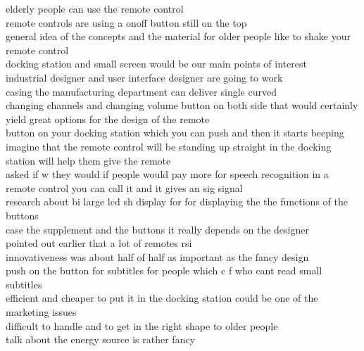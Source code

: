 \documentclass[11pt,a4paper]{article}
\begin{document}
\begin{mdframed}[style=theoremstyle, frametitle={Our System (FluCovRank) (250 words)}]
elderly people can use the remote control
\\ remote controls are using a onoff button still on the top
\\ general idea of the concepts and the material for older people like to shake your remote control
\\ docking station and small screen would be our main points of interest
\\ industrial designer and user interface designer are going to work
\\ casing the manufacturing department can deliver single curved
\\ changing channels and changing volume button on both side that would certainly yield great options for the design of the remote
\\ button on your docking station which you can push and then it starts beeping
\\ imagine that the remote control will be standing up straight in the docking station will help them give the remote
\\ asked if w they would if people would pay more for speech recognition in a remote control you can call it and it gives an sig signal
\\ research about bi large lcd sh display for for displaying the the functions of the buttons
\\ case the supplement and the buttons it really depends on the designer
\\ pointed out earlier that a lot of remotes rsi
\\ innovativeness was about half of half as important as the fancy design
\\ push on the button for subtitles for people which c f who cant read small subtitles
\\ efficient and cheaper to put it in the docking station could be one of the marketing issues
\\ difficult to handle and to get in the right shape to older people
\\ talk about the energy source is rather fancy
\end{mdframed}
\end{document}
